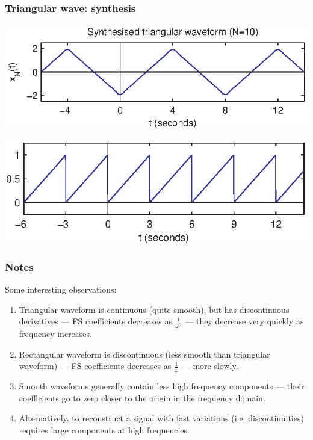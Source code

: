 \documentclass[10pt]{beamer}
\begin{document}
\begin{frame}
\frametitle{Triangular wave:  synthesis}
\begin{center}
  \includegraphics{fs_add_fig04}
\end{center}

\begin{center}
  \includegraphics{fs_add_fig07}
\end{center}
\end{frame}

\begin{frame}
\frametitle{Notes}
Some interesting observations:
\begin{enumerate}
\item Triangular waveform is continuous (quite smooth), but has discontinuous derivatives --- 
  FS coefficients decreases as $\frac{1}{\omega^2}$ --- they decrease very quickly as
  frequency increases.
\item Rectangular waveform is discontinuous (less smooth than triangular waveform) --- 
  FS coefficients decreases as $\frac{1}{\omega}$ --- more slowly.
\item Smooth waveforms generally contain less high frequency components --- their coefficients
go to zero closer to the origin in the frequency domain.
\item Alternatively, to reconstruct a signal with fast variations (i.e. discontinuities)
  requires large components at high frequencies.
\end{enumerate}

\end{frame}
\end{document}
